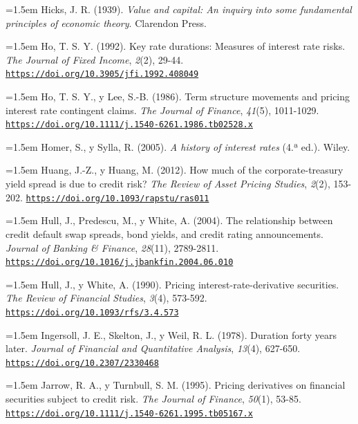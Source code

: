 \documentclass[10pt,a4paper]{article}
\begin{document}
\noindent\hangindent=1.5em Hicks, J. R. (1939). \textit{Value and capital: An inquiry into some fundamental principles of economic theory}. Clarendon Press.

\noindent\hangindent=1.5em Ho, T. S. Y. (1992). Key rate durations: Measures of interest rate risks. \textit{The Journal of Fixed Income}, \textit{2}(2), 29-44. \href{https://doi.org/10.3905/jfi.1992.408049}{\nolinkurl{https://doi.org/10.3905/jfi.1992.408049}}

\noindent\hangindent=1.5em Ho, T. S. Y., y Lee, S.-B. (1986). Term structure movements and pricing interest rate contingent claims. \textit{The Journal of Finance}, \textit{41}(5), 1011-1029. \href{https://doi.org/10.1111/j.1540-6261.1986.tb02528.x}{\nolinkurl{https://doi.org/10.1111/j.1540-6261.1986.tb02528.x}}

\noindent\hangindent=1.5em Homer, S., y Sylla, R. (2005). \textit{A history of interest rates} (4.ª ed.). Wiley.

\noindent\hangindent=1.5em Huang, J.-Z., y Huang, M. (2012). How much of the corporate-treasury yield spread is due to credit risk? \textit{The Review of Asset Pricing Studies}, \textit{2}(2), 153-202. \href{https://doi.org/10.1093/rapstu/ras011}{\nolinkurl{https://doi.org/10.1093/rapstu/ras011}}

{\sloppy\noindent\hangindent=1.5em Hull, J., Predescu, M., y White, A. (2004). The relationship between credit default swap spreads, bond yields, and credit rating announcements. \textit{Journal of Banking \& Finance}, \textit{28}(11), 2789-2811. \href{https://doi.org/10.1016/j.jbankfin.2004.06.010}{\nolinkurl{https://doi.org/10.1016/j.jbankfin.2004.06.010}}\par}

{\sloppy\noindent\hangindent=1.5em Hull, J., y White, A. (1990). Pricing interest-rate-derivative securities. \textit{The Review of Financial Studies}, \textit{3}(4), 573-592. \href{https://doi.org/10.1093/rfs/3.4.573}{\nolinkurl{https://doi.org/10.1093/rfs/3.4.573}}\par}

\noindent\hangindent=1.5em Ingersoll, J. E., Skelton, J., y Weil, R. L. (1978). Duration forty years later. \textit{Journal of Financial and Quantitative Analysis}, \textit{13}(4), 627-650. \href{https://doi.org/10.2307/2330468}{\nolinkurl{https://doi.org/10.2307/2330468}}

\noindent\hangindent=1.5em Jarrow, R. A., y Turnbull, S. M. (1995). Pricing derivatives on financial securities subject to credit risk. \textit{The Journal of Finance}, \textit{50}(1), 53-85. \href{https://doi.org/10.1111/j.1540-6261.1995.tb05167.x}{\nolinkurl{https://doi.org/10.1111/j.1540-6261.1995.tb05167.x}}
\end{document}
